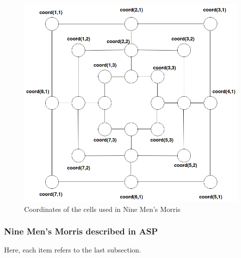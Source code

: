 \begin{figure}[h]
\centering
\includegraphics[width = 0.8\hsize]{9MM_coord.png}
\caption{Coordinates of the cells used in Nine Men's Morris}
\label{fig:9MM_coord}
\end{figure}

\subsubsection{Nine Men's Morris described in ASP}

Here, each item refers to the last subsection.

